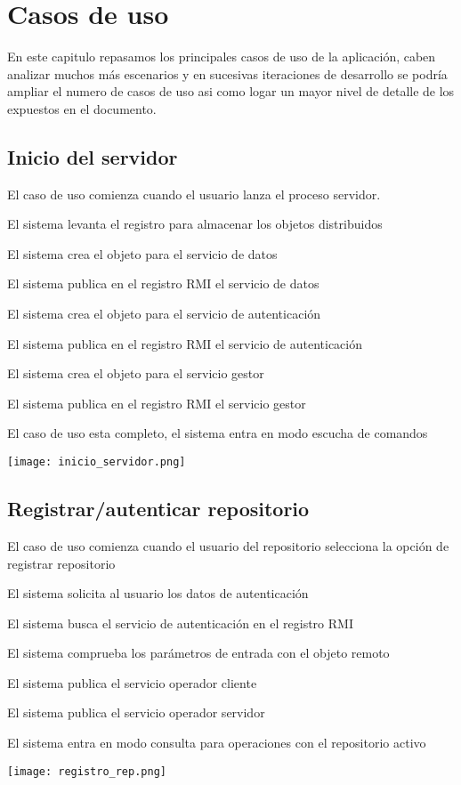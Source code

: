 \chapter{Casos de uso}

En este capitulo repasamos los principales casos de uso de la aplicación, caben analizar muchos más escenarios y en sucesivas iteraciones de desarrollo se podría ampliar el numero de casos de uso asi como logar un mayor nivel de detalle de los expuestos en el documento.

\section{Inicio del servidor}

\begin{compactenum}
	\item El caso de uso comienza cuando el usuario lanza el proceso servidor.
	\item El sistema levanta el registro para almacenar los objetos distribuidos
	\item El sistema crea el objeto para el servicio de datos
	\item El sistema publica en el registro RMI el servicio de datos
	\item El sistema crea el objeto para el servicio de autenticación
	\item El sistema publica en el registro RMI el servicio de autenticación
	\item El sistema crea el objeto para el servicio gestor
	\item El sistema publica en el registro RMI el servicio gestor
	\item El caso de uso esta completo, el sistema entra en modo escucha de comandos
\end{compactenum}
\texttt{[image: inicio\_servidor.png]}

\section{Registrar/autenticar repositorio}

\begin{compactenum}
	\item El caso de uso comienza cuando el usuario del repositorio selecciona la opción de registrar repositorio
	\item El sistema solicita al usuario los datos de autenticación
	\item El sistema busca el servicio de autenticación en el registro RMI
	\item El sistema comprueba los parámetros de entrada con el objeto remoto
	\item El sistema publica el servicio operador cliente
	\item El sistema publica el servicio operador servidor
	\item El sistema entra en modo consulta para operaciones con el repositorio activo
\end{compactenum}
\texttt{[image: registro\_rep.png]}

